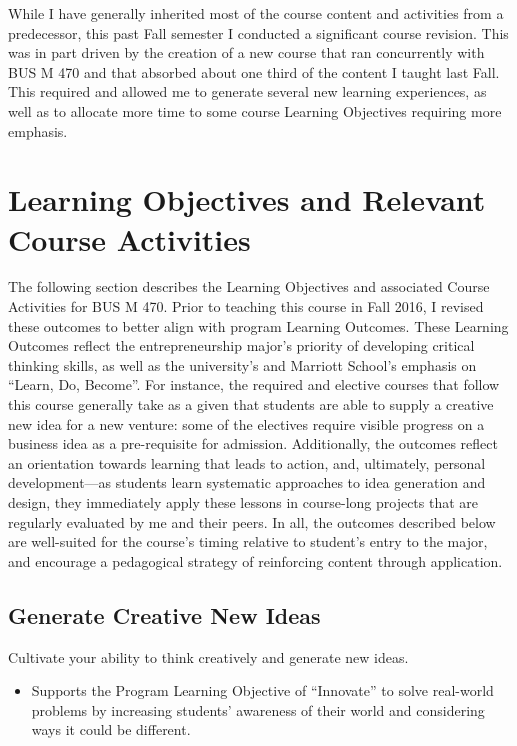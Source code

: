 \documentclass[11pt,article,oneside]{memoir}
\begin{document}
While I have generally inherited most of the course content and
activities from a predecessor, this past Fall semester I conducted a
significant course revision. This was in part driven by the creation of
a new course that ran concurrently with BUS M 470 and that absorbed
about one third of the content I taught last Fall. This required and
allowed me to generate several new learning experiences, as well as to
allocate more time to some course Learning Objectives requiring more
emphasis.

\section{Learning Objectives and Relevant Course
Activities}\label{learning-objectives-and-relevant-course-activities}

The following section describes the Learning Objectives and associated
Course Activities for BUS M 470. Prior to teaching this course in Fall
2016, I revised these outcomes to better align with program Learning
Outcomes. These Learning Outcomes reflect the entrepreneurship major's
priority of developing critical thinking skills, as well as the
university's and Marriott School's emphasis on \enquote{Learn, Do,
Become}. For instance, the required and elective courses that follow
this course generally take as a given that students are able to supply a
creative new idea for a new venture: some of the electives require
visible progress on a business idea as a pre-requisite for admission.
Additionally, the outcomes reflect an orientation towards learning that
leads to action, and, ultimately, personal development---as students
learn systematic approaches to idea generation and design, they
immediately apply these lessons in course-long projects that are
regularly evaluated by me and their peers. In all, the outcomes
described below are well-suited for the course's timing relative to
student's entry to the major, and encourage a pedagogical strategy of
reinforcing content through application.

\subsection{Generate Creative New
Ideas}\label{generate-creative-new-ideas}

Cultivate your ability to think creatively and generate new ideas.

\begin{itemize}
\tightlist
\item
  Supports the Program Learning Objective of \enquote{Innovate} to solve
  real-world problems by increasing students' awareness of their world
  and considering ways it could be different.
\end{itemize}
\end{document}
